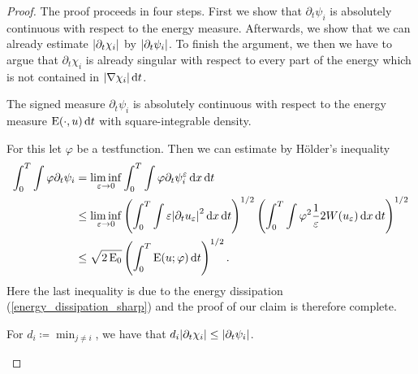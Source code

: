 \begin{proof}
	The proof proceeds in four steps. First we show that $ \partial_{ t } \psi_{ i } $ is absolutely continuous with respect to the energy measure. Afterwards, we show that we can already estimate $ \abs{ \partial_{ t } \chi_{ i } } $ by $ \abs{ \partial_{ t } \psi_{ i } } $. To finish the argument, we then we have to argue that $ \partial_{ t } \chi_{ i } $ is already singular with respect to every part of the energy which is not contained in $ \abs{ \nabla \chi_{ i } } \dd{ t } $.
	 
	\begin{description}[wide=0pt]
		\item[Step 1:] The signed measure $ \partial_{  t } \psi_{ i } $ is absolutely continuous with respect to the energy measure $ \operatorname{E} ( \cdot, u ) \dd{t } $ with square-integrable density.
		
		For this let $ \varphi $ be a testfunction. Then we can estimate by Hölder's inequality
		\begin{align*}
			\int_{ 0 }^{ T }
				\int
					\varphi
					\partial_{ t } \psi_{ i }
			& =
			\liminf_{ \varepsilon \to 0 }
				\int_{ 0 }^{ T }
					\int
						\varphi
						\partial_{ t } \psi_{ i }^{ \varepsilon }
					\dd{ x }
				\dd{ t }
			\\
			& \leq
			\liminf_{ \varepsilon \to 0 }
				\left(
					\int_{ 0 }^{ T }
						\int
							\varepsilon 
							\abs{ \partial_{ t } u_{ \varepsilon } }^{ 2 }
						\dd{ x }
					\dd{ t }
				\right)^{ 1/2 }
				\left(
					\int_{ 0 }^{ T }
						\int
							\varphi^{ 2 }
							\frac{ 1 }{ \varepsilon }
							2 W ( u_{ \varepsilon } )
						\dd{ x }
					\dd{ t }
				\right)^{ 1/2 }
			\\
			& \leq
			\sqrt{ 2 \operatorname{E}_{ 0 } }
			\left(
				\int_{ 0 }^{ T }
					\operatorname{E} ( u ; \varphi )
				\dd{ t }
			\right)^{ 1/2 }.
		\end{align*}
		Here the last inequality is due to the energy dissipation (\ref{energy_dissipation_sharp})
		and the proof of our claim is therefore complete.
		
		\item[Step 2:] For $ d_{ i } \coloneqq \min_{ j \neq i } $, we have that $ d_{ i } \abs{ \partial_{ t } \chi_{ i } } \leq \abs{ \partial_{ t } \psi_{ i } } $.
		

\end{description}
\end{proof}
